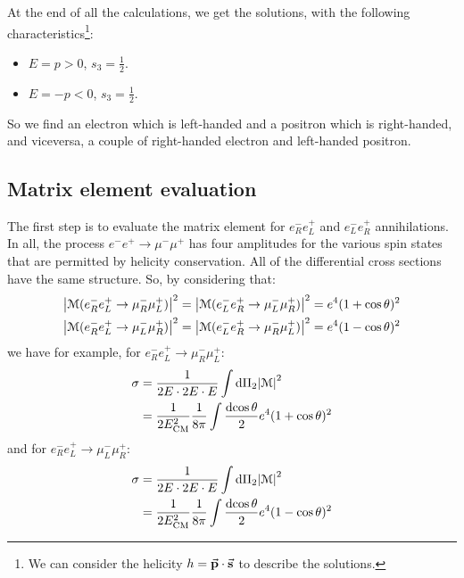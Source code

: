 \documentclass[../../main/main.tex]{subfiles}
\begin{document}
At the end of all the calculations, we get the solutions, with the following characteristics\footnote{We can consider the helicity \( h = \va{p} \cdot \va{s} \) to describe the solutions.}:
\begin{itemize}
	\item \( E = p > 0 \), \( s_3 = \frac{1}{2} \).
	\item \( E =-p < 0 \), \( s_3 = \frac{1}{2} \).
\end{itemize}
So we find an electron which is left-handed and a positron which is right-handed, and viceversa, a couple of right-handed electron and left-handed positron.



\subsection{Matrix element evaluation}
The first step is to evaluate the matrix element for \( e^-_R e^+_L \) and \( e^-_L e^+_R \) annihilations. In all, the process \( e^-e^+ \longrightarrow \mu^-\mu^+ \) has four amplitudes for the various spin states that are permitted by helicity conservation. All of the differential cross sections have the same structure. So, by considering that:
\begin{subequations}
	\begin{align}
		\abs{\mathcal{M}(e^-_R e^+_L \rightarrow \mu^-_R \mu^+_L)}^2
		&=
		\abs{\mathcal{M}(e^-_L e^+_R \rightarrow \mu^-_L \mu^+_R)}^2
		=
		e^4 (1 + \cos \theta)^2
		\\
		\abs{\mathcal{M}(e^-_R e^+_L \rightarrow \mu^-_L \mu^+_R)}^2
		&=
		\abs{\mathcal{M}(e^-_L e^+_R \rightarrow \mu^-_R \mu^+_L)}^2
		=
		e^4 (1 - \cos \theta)^2
	\end{align}
	\label{eq:}
\end{subequations}
we have for example, for \( e^-_R e^+_L \longrightarrow \mu^-_R \mu^+_L \):
\begin{align}
	\sigma 	&= \frac{1}{2E \cdot 2E \cdot E} \int \mathrm{d}{\Pi_2} \abs{\mathcal{M}}^2 \nonumber \\
	 		&= \frac{1}{2E^2_\mathrm{CM}} \frac{1}{8\pi} \int \frac{\mathrm{d}{\cos \theta}}{2} e^4 (1 + \cos \theta)^2
	\label{eq:}
\end{align}
and for \( e^-_R e^+_L \longrightarrow \mu^-_L \mu^+_R \):
\begin{align}
	\sigma 	&= \frac{1}{2E \cdot 2E \cdot E} \int \mathrm{d}{\Pi_2} \abs{\mathcal{M}}^2 \nonumber \\
	 		&= \frac{1}{2E^2_\mathrm{CM}} \frac{1}{8\pi} \int \frac{\mathrm{d}{\cos \theta}}{2} e^4 (1 - \cos \theta)^2
	\label{eq:}
\end{align}
\end{document}
